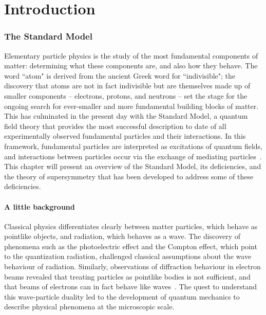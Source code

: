 \chapter{Introduction\label{sec:intro}}



\subsection{The Standard Model\label{sec:SM}}

Elementary particle physics is the study of the most fundamental components of matter: determining what these components are, and also how they behave. The word ``atom" is derived from the ancient Greek word for ``indivisible"; the discovery that atoms are not in fact indivisible but are themselves made up of smaller components -- electrons, protons, and neutrons -- set the stage for the ongoing search for ever-smaller and more fundamental building blocks of matter. This has culminated in the present day with the Standard Model, a quantum field theory that provides the most successful description to date of all experimentally observed fundamental particles and their interactions. In this framework, fundamental particles are interpreted as excitations of quantum fields, and interactions between particles occur via the exchange of mediating particles~\cite{BettiniPhysics}. This chapter will present an overview of the Standard Model, its deficiencies, and the theory of supersymmetry that has been developed to address some of these deficiencies.

\subsubsection{A little background\label{sec:SM-history}}

Classical physics differentiates clearly between matter particles, which behave as pointlike objects, and radiation, which behaves as a wave. The discovery of phenomena such as the photoelectric effect and the Compton effect, which point to the quantization radiation, challenged classical assumptions about the wave behaviour of radiation. Similarly, observations of diffraction behaviour in electron beams revealed that treating particles as pointlike bodies is not sufficient, and that beams of electrons can in fact behave like waves~\cite{MessiahPhysics}. The quest to understand this wave-particle duality led to the development of quantum mechanics to describe physical phenomena at the microscopic scale.

